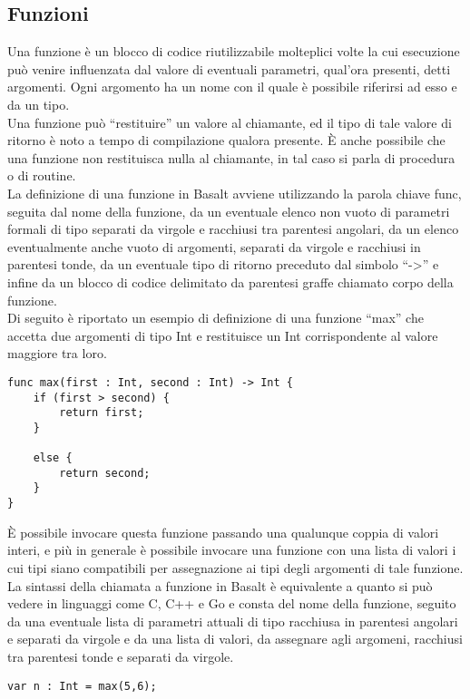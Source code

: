 \subsection{Funzioni}
Una funzione è un blocco di codice riutilizzabile molteplici volte la cui esecuzione può venire 
influenzata dal valore di eventuali parametri, qual’ora presenti, detti argomenti. Ogni argomento 
ha un nome con il quale è possibile riferirsi ad esso e da un tipo. \\

Una funzione può “restituire” un valore al chiamante, ed il tipo di tale valore di ritorno 
è noto a tempo di compilazione qualora presente. È anche possibile che una funzione 
non restituisca nulla al chiamante, in tal caso si parla di procedura o di routine. \\

La definizione di una funzione in Basalt avviene utilizzando la parola chiave func, seguita 
dal nome della funzione, da un eventuale elenco non vuoto di parametri 
formali di tipo separati da virgole e racchiusi tra parentesi angolari, 
da un elenco eventualmente anche vuoto di argomenti, separati da virgole e 
racchiusi in parentesi tonde, da un eventuale tipo di ritorno preceduto 
dal simbolo “->” e infine da un blocco di codice delimitato da parentesi graffe 
chiamato corpo della funzione. \\ 

Di seguito è riportato un esempio di definizione di una funzione “max” che accetta 
due argomenti di tipo Int e restituisce un Int corrispondente al valore maggiore tra loro.

\vspace{0.5cm}
\begin{lstlisting}[frame=single]
func max(first : Int, second : Int) -> Int {
    if (first > second) {
        return first; 
    }
    
    else {
        return second;
    }
}
\end{lstlisting}
\vspace{0.5cm}

È possibile invocare questa funzione passando una qualunque coppia di valori interi, 
e più in generale è possibile invocare una funzione con una lista di valori i cui tipi 
siano compatibili per assegnazione ai tipi degli argomenti di tale funzione. La sintassi 
della chiamata a funzione in Basalt è equivalente a quanto si può vedere in linguaggi 
come C, C++ e Go e consta del nome della funzione, seguito da una eventuale lista di 
parametri attuali di tipo racchiusa in parentesi angolari e separati da virgole e 
da una lista di valori, da assegnare agli argomeni, racchiusi tra parentesi tonde 
e separati da virgole.

\vspace{0.5cm}
\begin{lstlisting}[frame=single]
var n : Int = max(5,6);
\end{lstlisting}
\vspace{0.5cm}
\newpage


